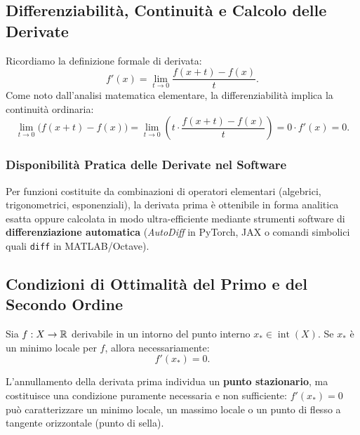 \subsection{Differenziabilit\`a, Continuit\`a e Calcolo delle Derivate}
Ricordiamo la definizione formale di derivata:
\begin{equation}
    f'(x) = \lim_{t \to 0} \frac{f(x+t) - f(x)}{t}.
\end{equation}
Come noto dall'analisi matematica elementare, la differenziabilit\`a implica la continuit\`a ordinaria:
\begin{equation}
    \lim_{t \to 0} \big( f(x+t) - f(x) \big) = \lim_{t \to 0} \left( t \cdot \frac{f(x+t) - f(x)}{t} \right) = 0 \cdot f'(x) = 0.
\end{equation}

\subsubsection{Disponibilit\`a Pratica delle Derivate nel Software}
Per funzioni costituite da combinazioni di operatori elementari (algebrici, trigonometrici, esponenziali), la derivata prima \`e ottenibile in forma analitica esatta oppure calcolata in modo ultra-efficiente mediante strumenti software di \textbf{differenziazione automatica} (\textit{AutoDiff} in PyTorch, JAX o comandi simbolici quali \texttt{diff} in MATLAB/Octave).

\subsection{Condizioni di Ottimalit\`a del Primo e del Secondo Ordine}

\begin{theorem}
Sia $f: X \to \mathbb{R}$ derivabile in un intorno del punto interno $x_* \in \operatorname{int}(X)$. Se $x_*$ \`e un minimo locale per $f$, allora necessariamente:
\begin{equation}
    f'(x_*) = 0.
\end{equation}
\end{theorem}

L'annullamento della derivata prima individua un \textbf{punto stazionario}, ma costituisce una condizione puramente necessaria e non sufficiente: $f'(x_*) = 0$ pu\`o caratterizzare un minimo locale, un massimo locale o un punto di flesso a tangente orizzontale (punto di sella).

